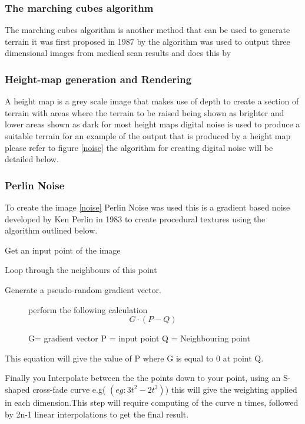 \subsubsection{The marching cubes algorithm}
The marching cubes algorithm is another method that can be used to generate terrain it was first proposed in 1987 by \cite{marching} the algorithm was used to output three dimensional images from medical scan results and does this by  

\subsubsection{Height-map generation and Rendering}
A height map is a grey scale image that makes use of depth to create a section of terrain with areas where the terrain to be raised being shown as brighter and lower areas shown as dark for most height maps digital noise is used to produce a suitable terrain for an example of the output that is produced by a height map please refer to figure \ref{noise} the algorithm for creating digital noise will be detailed below. 

\subsubsection{Perlin Noise}
\label{Perlin}
To create the image \ref{noise} Perlin Noise was used this is a gradient based noise developed by Ken Perlin in 1983 \cite{perlin} to create procedural textures using the algorithm outlined below. 
\begin{itemize}
\item Get an input point of the image 
\item Loop through the neighbours of this point
\item Generate a pseudo-random gradient vector.
\begin{figure}[h]
\centering
\item perform the following calculation
\begin{equation}
\label{eq:Noise}
G \cdot(P-Q)
\end{equation}
\caption{G= gradient vector P = input point Q = Neighbouring point}
\label{noise:eq}
\end{figure}

This equation will give the value of P where G is equal to 0 at point Q.
\item Finally you Interpolate between the the points down to your point, using an S-shaped cross-fade curve e.g( 
\begin{math}(eg: 3t^2-2t^3)\end{math}) this will give the weighting applied in each dimension.This step will require computing of the curve n times, followed by 2n-1 linear interpolations to get the final result.
\end{itemize}

